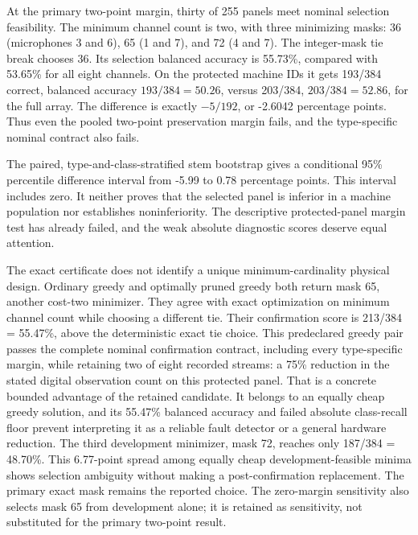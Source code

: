 \documentclass[
  11pt,
  a4paper,
]{report}
\begin{document}
At the primary two-point margin, thirty of 255 panels meet nominal
selection feasibility. The minimum channel count is two, with three
minimizing masks: 36 (microphones 3 and 6), 65 (1 and 7), and 72 (4 and
7). The integer-mask tie break chooses 36. Its selection balanced
accuracy is 55.73\%, compared with 53.65\% for all eight channels. On
the protected machine IDs it gets 193/384 correct, balanced accuracy
\(193/384=50.26%
\), versus 203/384, \(203/384=52.86%
\), for the full array. The difference is exactly \(-5/192\), or -2.6042
percentage points. Thus even the pooled two-point preservation margin
fails, and the type-specific nominal contract also fails.

The paired, type-and-class-stratified stem bootstrap gives a conditional
95\% percentile difference interval from -5.99 to 0.78 percentage
points. This interval includes zero. It neither proves that the selected
panel is inferior in a machine population nor establishes
noninferiority. The descriptive protected-panel margin test has already
failed, and the weak absolute diagnostic scores deserve equal attention.

The exact certificate does not identify a unique minimum-cardinality
physical design. Ordinary greedy and optimally pruned greedy both return
mask 65, another cost-two minimizer. They agree with exact optimization
on minimum channel count while choosing a different tie. Their
confirmation score is 213/384 = 55.47\%, above the deterministic exact
tie choice. This predeclared greedy pair passes the complete nominal
confirmation contract, including every type-specific margin, while
retaining two of eight recorded streams: a 75\% reduction in the stated
digital observation count on this protected panel. That is a concrete
bounded advantage of the retained candidate. It belongs to an equally
cheap greedy solution, and its 55.47\% balanced accuracy and failed
absolute class-recall floor prevent interpreting it as a reliable fault
detector or a general hardware reduction. The third development
minimizer, mask 72, reaches only 187/384 = 48.70\%. This 6.77-point
spread among equally cheap development-feasible minima shows selection
ambiguity without making a post-confirmation replacement. The primary
exact mask remains the reported choice. The zero-margin sensitivity also
selects mask 65 from development alone; it is retained as sensitivity,
not substituted for the primary two-point result.
\end{document}
